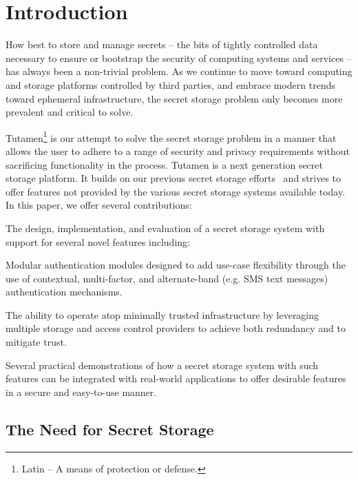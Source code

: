 \section{Introduction}
\label{sec:intro}

How best to store and manage secrets -- the bits of tightly controlled
data necessary to ensure or bootstrap the security of computing
systems and services -- has always been a non-trivial problem. As we
continue to move toward computing and storage platforms controlled by
third parties, and embrace modern trends toward ephemeral
infrastructure, the secret storage problem only becomes more prevalent
and critical to solve.

Tutamen\footnote{Latin -- A means of protection or defense.} is our
attempt to solve the secret storage problem in a manner that allows
the user to adhere to a range of security and privacy requirements
without sacrificing functionality in the process. Tutamen is a next
generation secret storage platform. It builds on our previous secret
storage efforts~\cite{custos-trios} and strives to offer features not
provided by the various secret storage systems available today. In
this paper, we offer several contributions:

\begin{packed_item}
\item The design, implementation, and evaluation of a secret storage
  system with support for several novel features including:
  \begin{packed_item}
  \item Modular authentication modules designed to add use-case
    flexibility through the use of contextual, multi-factor, and
    alternate-band (e.g. SMS text messages) authentication mechanisms.
  \item The ability to operate atop minimally trusted infrastructure
    by leveraging multiple storage and access control providers to
    achieve both redundancy and to mitigate trust.
  \end{packed_item}
\item Several practical demonstrations of how a secret storage system
  with such features can be integrated with real-world applications to
  offer desirable features in a secure and easy-to-use manner.
\end{packed_item}

\subsection{The Need for Secret Storage}

